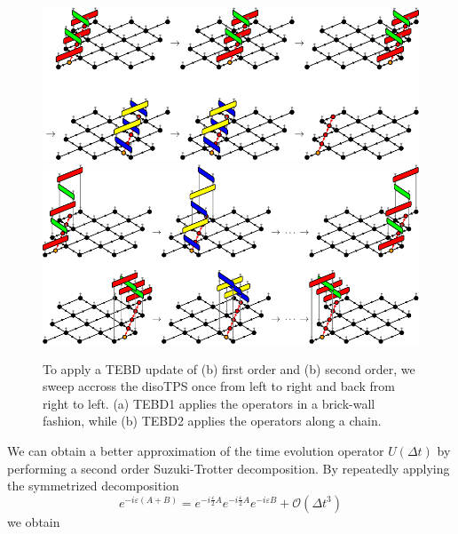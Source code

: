 \begin{figure}
	\centering
	\subcaptionbox{\label{fig:disoTPS_TEBD_global_update_applying_TEBD1}}
	{%
		\includegraphics[scale=1]{figures/tikz/disoTPS/tebd_global_update_steps/tebd_global_update_steps_a.pdf}
	}
	\subcaptionbox{\label{fig:disoTPS_TEBD_global_update_applying_TEBD2}}
	{%
		\includegraphics[scale=1]{figures/tikz/disoTPS/tebd_global_update_steps/tebd_global_update_steps_b.pdf}
	}
	\caption{To apply a TEBD update of (b) first order and (b) second order, we sweep accross the disoTPS once from left to right and back from right to left. (a) TEBD1 applies the operators in a brick-wall fashion, while (b) TEBD2 applies the operators along a chain. }
	\label{fig:disoTPS_TEBD_global_update_applying_TEBD}
\end{figure}
We can obtain a better approximation of the time evolution operator $U(\Delta t)$ by performing a second order Suzuki-Trotter decomposition. By repeatedly applying the symmetrized decomposition
\begin{equation}
	e^{-i\varepsilon(A+B)} = e^{-i\frac{\varepsilon}{2}A}e^{-i\frac{\varepsilon}{2}A}e^{-i\varepsilon B} + \mathcal{O}(\Delta t^3)
\end{equation}
we obtain
